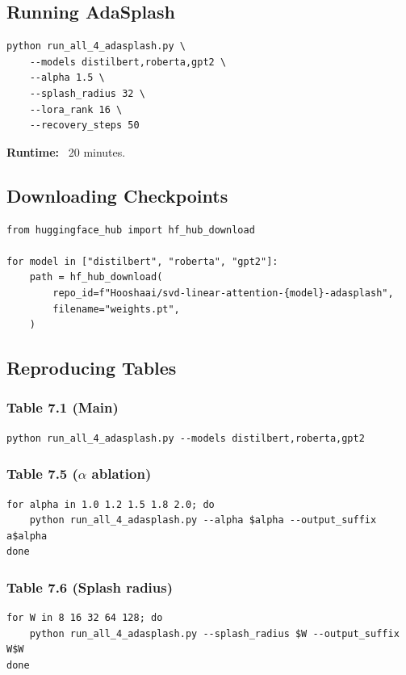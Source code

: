 \subsection{Running AdaSplash}

\begin{lstlisting}
python run_all_4_adasplash.py \
    --models distilbert,roberta,gpt2 \
    --alpha 1.5 \
    --splash_radius 32 \
    --lora_rank 16 \
    --recovery_steps 50
\end{lstlisting}

\textbf{Runtime:} ~20 minutes.

\subsection{Downloading Checkpoints}

\begin{lstlisting}
from huggingface_hub import hf_hub_download

for model in ["distilbert", "roberta", "gpt2"]:
    path = hf_hub_download(
        repo_id=f"Hooshaai/svd-linear-attention-{model}-adasplash",
        filename="weights.pt",
    )
\end{lstlisting}

\subsection{Reproducing Tables}

\subsubsection{Table 7.1 (Main)}
\begin{lstlisting}
python run_all_4_adasplash.py --models distilbert,roberta,gpt2
\end{lstlisting}

\subsubsection{Table 7.5 ($\alpha$ ablation)}
\begin{lstlisting}
for alpha in 1.0 1.2 1.5 1.8 2.0; do
    python run_all_4_adasplash.py --alpha $alpha --output_suffix a$alpha
done
\end{lstlisting}

\subsubsection{Table 7.6 (Splash radius)}
\begin{lstlisting}
for W in 8 16 32 64 128; do
    python run_all_4_adasplash.py --splash_radius $W --output_suffix W$W
done
\end{lstlisting}

